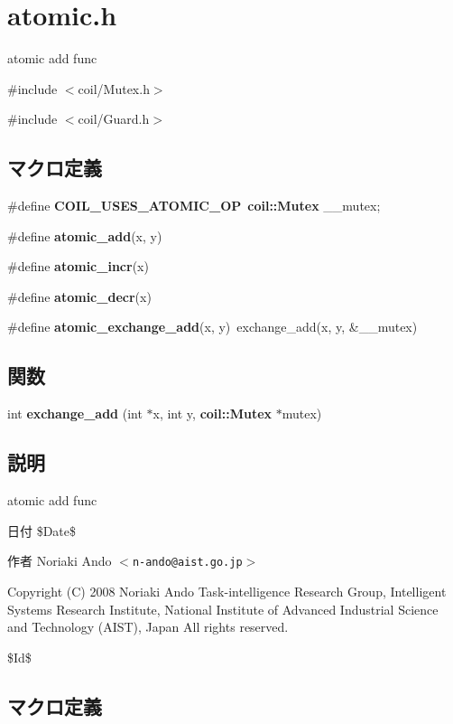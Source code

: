 \section{atomic.h}
\label{atomic_8h}


atomic add func  


{\ttfamily \#include $<$coil/Mutex.h$>$}\par
{\ttfamily \#include $<$coil/Guard.h$>$}\par
\subsection*{マクロ定義}
\begin{DoxyCompactItemize}
\item 
\#define {\bf COIL\_\-USES\_\-ATOMIC\_\-OP}~{\bf coil::Mutex} \_\-\_\-mutex;
\item 
\#define {\bf atomic\_\-add}(x, y)
\item 
\#define {\bf atomic\_\-incr}(x)
\item 
\#define {\bf atomic\_\-decr}(x)
\item 
\#define {\bf atomic\_\-exchange\_\-add}(x, y)~exchange\_\-add(x, y, \&\_\-\_\-mutex)
\end{DoxyCompactItemize}
\subsection*{関数}
\begin{DoxyCompactItemize}
\item 
int {\bf exchange\_\-add} (int $\ast$x, int y, {\bf coil::Mutex} $\ast$mutex)
\end{DoxyCompactItemize}


\subsection{説明}
atomic add func \begin{DoxyDate}{日付}
\$Date\$ 
\end{DoxyDate}
\begin{DoxyAuthor}{作者}
Noriaki Ando $<${\tt n-\/ando@aist.go.jp}$>$
\end{DoxyAuthor}
Copyright (C) 2008 Noriaki Ando Task-\/intelligence Research Group, Intelligent Systems Research Institute, National Institute of Advanced Industrial Science and Technology (AIST), Japan All rights reserved.

\$Id\$ 

\subsection{マクロ定義}
